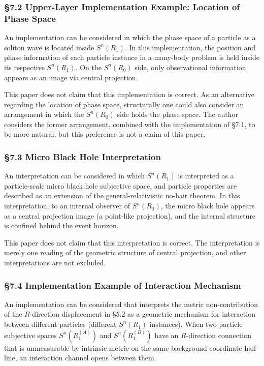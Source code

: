 \documentclass[
  a4paper,11pt]{article}
\begin{document}
\subsubsection{§7.2 Upper-Layer Implementation Example: Location of
Phase
Space}\label{upper-layer-implementation-example-location-of-phase-space}

An implementation can be considered in which the phase space of a
particle as a soliton wave is located inside \(S^n(R_1)\). In this
implementation, the position and phase information of each particle
instance in a many-body problem is held inside its respective
\(S^n(R_1)\). On the \(S^n(R_0)\) side, only observational information
appears as an image via central projection.

This paper does not claim that this implementation is correct. As an
alternative regarding the location of phase space, structurally one
could also consider an arrangement in which the \(S^n(R_0)\) side holds
the phase space. The author considers the former arrangement, combined
with the implementation of §7.1, to be more natural, but this preference
is not a claim of this paper.

\subsubsection{§7.3 Micro Black Hole
Interpretation}\label{micro-black-hole-interpretation}

An interpretation can be considered in which \(S^n(R_1)\) is interpreted
as a particle-scale micro black hole subjective space, and particle
properties are described as an extension of the general-relativistic
no-hair theorem. In this interpretation, to an internal observer of
\(S^n(R_0)\), the micro black hole appears as a central projection image
(a point-like projection), and the internal structure is confined behind
the event horizon.

This paper does not claim that this interpretation is correct. The
interpretation is merely one reading of the geometric structure of
central projection, and other interpretations are not excluded.

\subsubsection{§7.4 Implementation Example of Interaction
Mechanism}\label{implementation-example-of-interaction-mechanism}

An implementation can be considered that interprets the metric
non-contribution of the \(R\)-direction displacement in §5.2 as a
geometric mechanism for interaction between different particles
(different \(S^n(R_1)\) instances). When two particle subjective spaces
\(S^n(R_1^{(A)})\) and \(S^n(R_1^{(B)})\) have an \(R\)-direction
connection that is unmeasurable by intrinsic metric on the same
background coordinate half-line, an interaction channel opens between
them.
\end{document}
